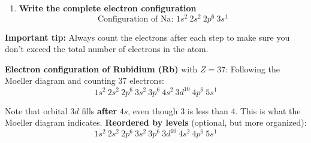 \begin{enumerate}[label=\textbf{Step \arabic*:}]
\begin{itemize}
            Electrons placed: 2 (from \( 1s \)) + 2 (from \( 2s \)) + 6 (from \( 2p \)) + 1 (from \( 3s \)) = 11. Perfect! We have placed them all

            Electrons placed: 10 + 1 = 11.
        \end{itemize}

        \item \textbf{Write the complete electron configuration}
        \[
            \text{Configuration of Na: } 1s^2\ 2s^2\ 2p^6\ 3s^1
        \]
\end{enumerate}
\begin{remark}
    \textbf{Important tip:} Always count the electrons after each step to make sure you don't exceed the total number of electrons in the atom.
\end{remark}
\begin{example}
    \textbf{Electron configuration of Rubidium (Rb)} with \( Z = 37 \):
    Following the Moeller diagram and counting 37 electrons:
    \[
        1s^2\ 2s^2\ 2p^6\ 3s^2\ 3p^6\ 4s^2\ 3d^{10}\ 4p^6\ 5s^1
    \]

    Note that orbital \( 3d \) fills \textbf{after} \( 4s \), even though 3 is less than 4. This is what the Moeller diagram indicates.
    \textbf{Reordered by levels} (optional, but more organized):
    \[
        1s^2\ 2s^2\ 2p^6\ 3s^2\ 3p^6\ 3d^{10}\ 4s^2\ 4p^6\ 5s^1
    \]
\end{example}
